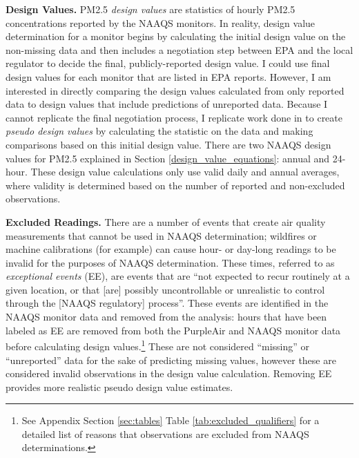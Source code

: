 \documentclass[12pt]{article}
\begin{document}
\textbf{Design Values.} PM2.5 \textit{design values} are statistics of hourly PM2.5 concentrations reported by the NAAQS monitors. In reality, design value determination for a monitor begins by calculating the initial design value on the non-missing data and then includes a negotiation step between EPA and the local regulator to decide the final, publicly-reported design value. I could use final design values for each monitor that are listed in EPA reports. However, I am interested in directly comparing the design values calculated from only reported data to design values that include predictions of unreported data. Because I cannot replicate the final negotiation process, I replicate work done in \citep{fowlieBringingSatelliteBasedAir2019} to create \textit{pseudo design values} by calculating the statistic on the data and making comparisons based on this initial design value. There are two NAAQS design values for PM2.5 explained in Section \ref{design_value_equations}: annual and 24-hour. These design value calculations only use valid daily and annual averages, where validity is determined based on the number of reported and non-excluded observations.

\textbf{Excluded Readings.} There are a number of events that create air quality measurements that cannot be used in NAAQS determination; wildfires or machine calibrations (for example) can cause hour- or day-long readings to be invalid for the purposes of NAAQS determination. These times, referred to as \textit{exceptional events} (EE), are events that are ``not expected to recur routinely at a given location, or that [are] possibly uncontrollable or unrealistic to control through the [NAAQS regulatory] process''\citep{epaEventQualifier1990}. These events are identified in the NAAQS monitor data and removed from the analysis: hours that have been labeled as EE are removed from both the PurpleAir and NAAQS monitor data before calculating design values.\footnote{See Appendix Section \ref{sec:tables} Table \ref{tab:excluded_qualifiers} for a detailed list of reasons that observations are excluded from NAAQS determinations.} These are not considered ``missing'' or ``unreported'' data for the sake of predicting missing values, however these are considered invalid observations in the design value calculation. Removing EE provides more realistic pseudo design value estimates.

\textbf{}
\end{document}
